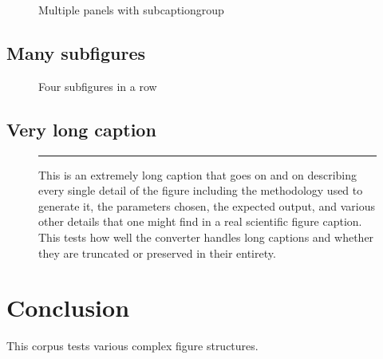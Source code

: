 \documentclass{article}
\begin{document}
\begin{figure}[ht]
  \centering
  \caption{Multiple panels with subcaptiongroup}
  \label{fig:panels}
\end{figure}

\subsection{Many subfigures}

\begin{figure}[ht]
  \centering
  \subfloat[Sub A]{\rule{2cm}{1.5cm}\label{fig:suba}}
  \subfloat[Sub B]{\rule{2cm}{1.5cm}\label{fig:subb}}
  \subfloat[Sub C]{\rule{2cm}{1.5cm}\label{fig:subc}}
  \subfloat[Sub D]{\rule{2cm}{1.5cm}\label{fig:subd}}
  \caption{Four subfigures in a row}
  \label{fig:four}
\end{figure}

\subsection{Very long caption}

\begin{figure}[ht]
  \centering
  \rule{5cm}{3cm}
  \caption{This is an extremely long caption that goes on and on describing every
    single detail of the figure including the methodology used to generate it,
    the parameters chosen, the expected output, and various other details that
    one might find in a real scientific figure caption. This tests how well
    the converter handles long captions and whether they are truncated or
    preserved in their entirety.}
  \label{fig:long}
\end{figure}

\section{Conclusion}

This corpus tests various complex figure structures.
\end{document}
